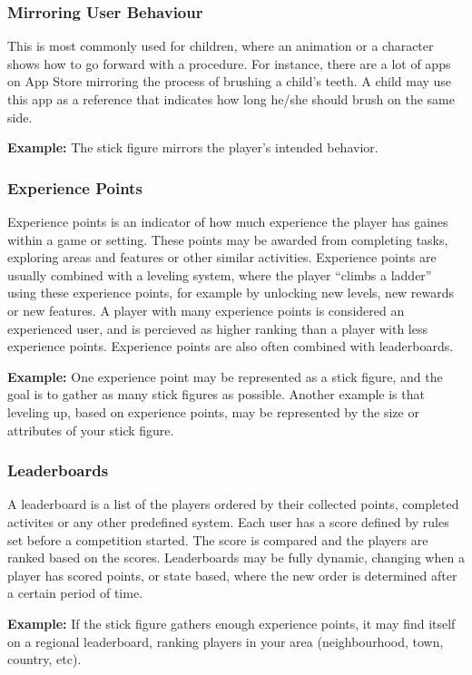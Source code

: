 \subsubsection{Mirroring User Behaviour}
\label{sec:mirroringuserbehaviour}
This is most commonly used for children, where an animation or a character shows how to go forward with a procedure. For instance, there are a lot of apps on App Store mirroring the process of brushing a child's teeth. A child may use this app as a reference that indicates how long he/she should brush on the same side.   

\textbf{Example:} The stick figure mirrors the player's intended behavior. 

\subsubsection{Experience Points}
\label{sec:experiencepoints}
Experience points is an indicator of how much experience the player has gaines within a game or setting. These points may be awarded from completing tasks, exploring areas and features or other similar activities. Experience points are usually combined with a leveling system, where the player ``climbs a ladder'' using these experience points, for example by unlocking new levels, new rewards or new features. A player with many experience points is considered an experienced user, and is percieved as higher ranking than a player with less experience points. Experience points are also often combined with leaderboards. 

\textbf{Example:} One experience point may be represented as a stick figure, and the goal is to gather as many stick figures as possible. Another example is that leveling up, based on experience points, may be represented by the size or attributes of your stick figure.

\subsubsection{Leaderboards}
\label{sec:leaderboards}
A leaderboard is a list of the players ordered by their collected points, completed activites or any other predefined system. Each user has a score defined by rules set before a competition started. The score is compared and the players are ranked based on the scores. Leaderboards may be fully dynamic, changing when a player has scored points, or state based, where the new order is determined after a certain period of time.

\textbf{Example:} If the stick figure gathers enough experience points, it may find itself on a regional leaderboard, ranking players in your area (neighbourhood, town, country, etc). 

